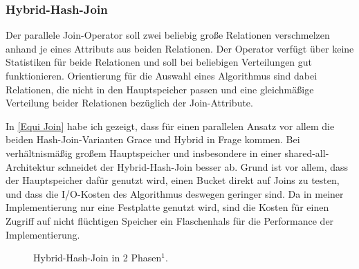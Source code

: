 \documentclass[a4paper,12pt,twoside]{article}
\begin{document}
\subsubsection{Hybrid-Hash-Join}
\label{entw:hash}

Der parallele Join-Operator soll zwei beliebig große Relationen verschmelzen anhand je eines Attributs aus beiden Relationen. Der Operator verfügt über keine Statistiken für beide Relationen und soll bei beliebigen Verteilungen gut funktionieren. Orientierung für die Auswahl eines Algorithmus sind dabei Relationen, die nicht in den Hauptspeicher passen und eine gleichmäßige Verteilung beider Relationen bezüglich der Join-Attribute.

In \autoref{Equi Join} habe ich gezeigt, dass für einen parallelen Ansatz vor allem die beiden Hash-Join-Varianten Grace und Hybrid in Frage kommen. Bei verhältnismäßig großem Hauptspeicher und insbesondere in einer shared-all-Architektur schneidet der Hybrid-Hash-Join besser ab. Grund ist vor allem, dass der Hauptspeicher dafür genutzt wird, einen Bucket direkt auf Joins zu testen, und dass die I/O-Kosten des Algorithmus deswegen geringer sind. Da in meiner Implementierung nur eine Festplatte genutzt wird, sind die Kosten für einen Zugriff auf nicht flüchtigen Speicher ein Flaschenhals für die Performance der Implementierung.

\begin{figure}
	\centering
	\qquad
	\footnotemark	
	\caption{Hybrid-Hash-Join in 2 Phasen$^1$.}
	\label{img:hybrid}
\end{figure}

\end{document}
